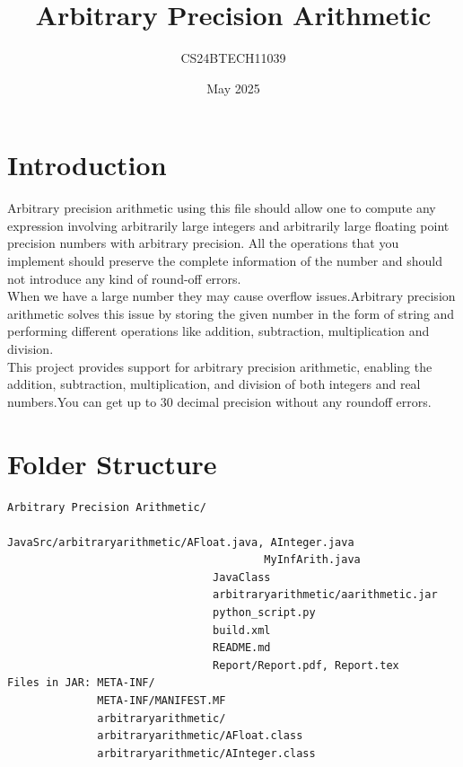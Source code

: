 \documentclass{article}
\begin{document}
\title{Arbitrary Precision Arithmetic}
\author{CS24BTECH11039}
\date{May 2025}
\maketitle

\section{Introduction}
Arbitrary precision arithmetic using this file should allow one to compute any expression involving arbitrarily large integers and arbitrarily large floating point precision numbers with arbitrary precision. All the operations that you
implement should preserve the complete information of the number and
should not introduce any kind of round-off errors.\\

When we have a large number they may cause overflow issues.Arbitrary precision arithmetic solves this issue by storing the given number in the form of string and performing different operations like addition, subtraction, multiplication and division.\\

This project provides support for arbitrary precision arithmetic, enabling the addition, subtraction, multiplication, and division of both integers and real numbers.You can get up to 30 decimal precision without any roundoff errors.

\section{Folder Structure}
\begin{center}
\begin{verbatim}
Arbitrary Precision Arithmetic/
                                JavaSrc/arbitraryarithmetic/AFloat.java, AInteger.java
                                        MyInfArith.java
                                JavaClass
                                arbitraryarithmetic/aarithmetic.jar
                                python_script.py
                                build.xml
                                README.md
                                Report/Report.pdf, Report.tex
Files in JAR: META-INF/
              META-INF/MANIFEST.MF
              arbitraryarithmetic/
              arbitraryarithmetic/AFloat.class
              arbitraryarithmetic/AInteger.class
\end{verbatim}
\end{center}
\end{document}
